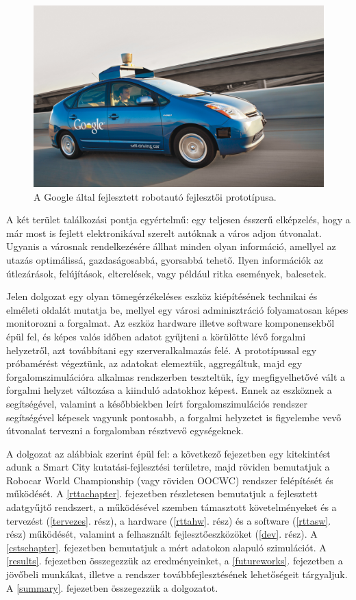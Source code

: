 \documentclass[a4paper,12pt]{report}
\begin{document}
\begin{figure}[h]
\centerline{
\includegraphics[width=6in]{img/googleauto}}
\caption{A Google által fejlesztett robotautó fejlesztői prototípusa.}
\label{googleauto}
\end{figure}

A két terület találkozási pontja egyértelmű: egy teljesen ésszerű elképzelés, hogy a már most is fejlett elektronikával szerelt autóknak a város adjon útvonalat. Ugyanis a városnak rendelkezésére állhat minden olyan információ, amellyel az utazás optimálissá, gazdaságosabbá, gyorsabbá tehető. Ilyen információk az útlezárások, felújítások, elterelések, vagy például ritka események, balesetek. 

Jelen dolgozat egy olyan tömegérzékeléses eszköz kiépítésének technikai és elméleti oldalát mutatja be, mellyel egy városi adminisztráció folyamatosan képes monitorozni a forgalmat. Az eszköz hardware illetve software komponensekből épül fel, és képes valós időben adatot gyűjteni a körülötte lévő forgalmi helyzetről, azt továbbítani egy szerveralkalmazás felé. A prototípussal egy próbamérést végeztünk, az adatokat elemeztük, aggregáltuk, majd egy forgalomszimulációra alkalmas rendszerben teszteltük, így megfigyelhetővé vált a forgalmi helyzet változása a kiinduló adatokhoz képest. Ennek az eszköznek a segítségével, valamint a későbbiekben leírt forgalomszimulációs rendszer segítségével képesek vagyunk pontosabb, a forgalmi helyzetet is figyelembe vevő útvonalat tervezni a forgalomban résztvevő egységeknek.

A dolgozat az alábbiak szerint épül fel: a következő fejezetben egy kitekintést adunk a Smart City kutatási-fejlesztési területre, majd röviden bemutatjuk a Robocar World Championship (vagy röviden OOCWC) rendszer felépítését és működését. A \ref{rttachapter}. fejezetben részletesen bemutatjuk a fejlesztett adatgyűjtő rendszert, a működésével szemben támasztott követelményeket és a tervezést (\ref{tervezes}. rész), a hardware (\ref{rttahw}. rész) és a software (\ref{rttasw}. rész) működését, valamint a felhasznált fejlesztőeszközöket (\ref{dev}. rész). A \ref{cstschapter}. fejezetben bemutatjuk a mért adatokon alapuló szimulációt. A \ref{results}. fejezetben összegezzük az eredményeinket, a \ref{futureworks}. fejezetben a jövőbeli munkákat, illetve a rendszer továbbfejlesztésének lehetőségeit tárgyaljuk.
A \ref{summary}. fejezetben összegezzük a dolgozatot.
\end{document}
